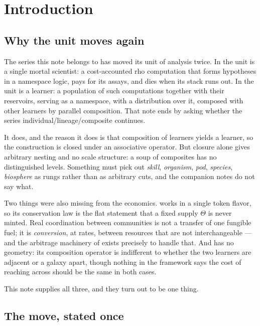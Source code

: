 \bigskip

\section{Introduction}\label{eng:S1}

\subsection{Why the unit moves again}\label{eng:S1.1}

The series this note belongs to has moved its unit of analysis twice. In
\chSci the unit is a single mortal scientist: a cost-accounted
rho computation that forms hypotheses in a namespace logic, pays for its
assays, and dies when its stack runs out. In \chComp the unit is a
learner: a population of such computations together with their reservoirs,
serving as a namespace, with a distribution over it, composed with other
learners by parallel composition. That note ends by asking whether the
series individual/lineage/composite continues.

It does, and the reason it does is that composition of learners yields a
learner, so the construction is closed under an associative operator. But
closure alone gives arbitrary nesting and no scale structure: a soup of
composites has no distinguished levels. Something must pick out
\emph{skill}, \emph{organism}, \emph{pod}, \emph{species}, \emph{biosphere}
as rungs rather than as arbitrary cuts, and the companion notes do not say
what.

Two things were also missing from the economics. \chComp works in a
single token flavor, so its conservation law is the flat statement that a
fixed supply $\Theta$ is never minted. Real coordination between
communities is not a transfer of one fungible fuel; it is
\emph{conversion}, at rates, between resources that are not interchangeable
--- and the arbitrage machinery of \cite{vtok} exists precisely to handle
that. And \chComp has no geometry: its composition operator is
indifferent to whether the two learners are adjacent or a galaxy apart,
though nothing in the framework says the cost of reaching across should be
the same in both cases.

This note supplies all three, and they turn out to be one thing.

\subsection{The move, stated once}\label{eng:S1.2}

